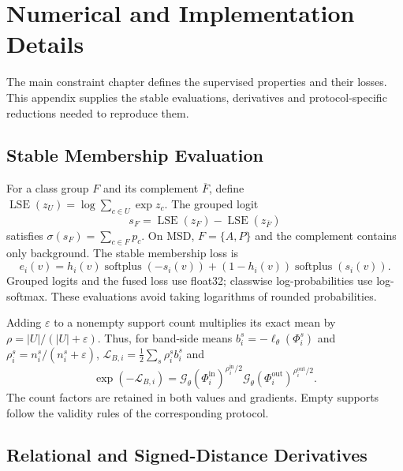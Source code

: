 \documentclass[12pt,a4paper]{article}
\begin{document}
\section{Numerical and Implementation Details}
\label{sec:technical-details}

The main constraint chapter defines the supervised properties and their
losses. This appendix supplies the stable evaluations, derivatives and
protocol-specific reductions needed to reproduce them.

\subsection{Stable Membership Evaluation}

For a class group $F$ and its complement $\overline F$, define
$\operatorname{LSE}(z_U)=\log\sum_{c\in U}\exp z_c$. The grouped logit
\begin{equation}
s_F=\operatorname{LSE}(z_F)-\operatorname{LSE}(z_{\overline F})
\label{eq:grouped-predicate-logit}
\end{equation}
satisfies $\sigma(s_F)=\sum_{c\in F}p_c$. On MSD, $F=\{A,P\}$
and the complement contains only background. The stable membership loss is
\begin{equation}
e_i(v)=h_i(v)\operatorname{softplus}(-s_i(v))
       +(1-h_i(v))\operatorname{softplus}(s_i(v)).
\label{eq:band-stable-bce}
\end{equation}
Grouped logits and the fused loss use float32; classwise log-probabilities
use log-softmax. These evaluations avoid taking logarithms of rounded
probabilities.

Adding $\varepsilon$ to a nonempty support count multiplies its exact
mean by $\rho=|U|/(|U|+\varepsilon)$. Thus, for band-side means
$b_i^s=-\ell_\theta(\Phi_i^s)$ and
$\rho_i^s=n_i^s/(n_i^s+\varepsilon)$,
$\mathcal L_{B,i}=\tfrac12\sum_s\rho_i^s b_i^s$ and
\begin{equation}
\exp(-\mathcal{L}_{B,i})
=\mathcal{G}_\theta(\Phi_i^{\mathrm{in}})^{\rho_i^{\mathrm{in}}/2}
 \mathcal{G}_\theta(\Phi_i^{\mathrm{out}})^{\rho_i^{\mathrm{out}}/2}.
\label{eq:balanced-band-satisfaction}
\end{equation}
The count factors are retained in both values and gradients. Empty
supports follow the validity rules of the corresponding protocol.

\subsection{Relational and Signed-Distance Derivatives}
\end{document}

